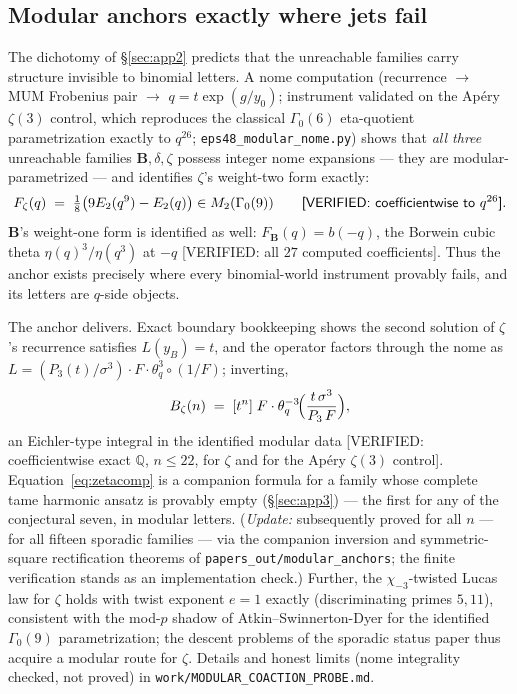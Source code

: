 \documentclass[11pt,reqno]{amsart}
\theoremstyle{plain}
\theoremstyle{definition}
\theoremstyle{remark}
\newcommand{\Q}{\mathbb{Q}}
\newcommand{\VerifiedR}[1]{\textup{\textsf{[VERIFIED: #1]}}}
\begin{document}
\subsection{Modular anchors exactly where jets fail}\label{sec:app5}
The dichotomy of §\ref{sec:app2} predicts that the unreachable families
carry structure invisible to binomial letters. A nome computation
(recurrence $\to$ MUM Frobenius pair $\to$ $q=t\exp(g/y_0)$; instrument
validated on the Ap\'ery $\zeta(3)$ control, which reproduces the classical
$\Gamma_0(6)$ eta-quotient parametrization exactly to $q^{26}$;
\texttt{eps48\_modular\_nome.py}) shows that \emph{all three} unreachable
families $\mathbf B,\delta,\zeta$ possess integer nome expansions --- they
are modular-parametrized --- and identifies $\zeta$'s weight-two form
exactly:
\[
F_\zeta(q)\;=\;\tfrac18\bigl(9E_2(q^9)-E_2(q)\bigr)\in
M_2(\Gamma_0(9))
\qquad\VerifiedR{coefficientwise to $q^{26}$}.
\]
$\mathbf B$'s weight-one form is identified as well:
$F_{\mathbf B}(q)=b(-q)$, the Borwein cubic theta
$\eta(q)^3/\eta(q^3)$ at $-q$ \VerifiedR{all $27$ computed coefficients}.
Thus the anchor exists precisely where every binomial-world instrument
provably fails, and its letters are $q$-side objects.

The anchor delivers. Exact boundary bookkeeping shows the second solution
of $\zeta$'s recurrence satisfies $L(y_B)=t$, and the operator factors
through the nome as $L=(P_3(t)/\sigma^3)\cdot F\cdot\theta_q^3\circ(1/F)$;
inverting,
\begin{equation}\label{eq:zetacomp}
B_\zeta(n)\;=\;[t^n]\;F\cdot\theta_q^{-3}\!\Bigl(\frac{t\,\sigma^3}{P_3\,F}\Bigr),
\end{equation}
an Eichler-type integral in the identified modular data
\VerifiedR{coefficientwise exact $\Q$, $n\le22$, for $\zeta$ and for the
Ap\'ery $\zeta(3)$ control}. Equation~\eqref{eq:zetacomp} is a companion
formula for a family whose complete tame harmonic ansatz is provably empty
(§\ref{sec:app3}) --- the first for any of the conjectural seven, in
modular letters. (\emph{Update:} subsequently proved for all $n$ --- for
all fifteen sporadic families --- via the companion inversion and
symmetric-square rectification theorems of
\texttt{papers\_out/modular\_anchors}; the finite verification stands as
an implementation check.) Further, the $\chi_{-3}$-twisted Lucas law for $\zeta$
holds with twist exponent $e=1$ exactly (discriminating primes $5,11$),
consistent with the mod-$p$ shadow of Atkin--Swinnerton-Dyer for the
identified $\Gamma_0(9)$ parametrization; the descent problems of the
sporadic status paper thus acquire a modular route for $\zeta$. Details
and honest limits (nome integrality checked, not proved) in
\texttt{work/MODULAR\_COACTION\_PROBE.md}.
\end{document}
